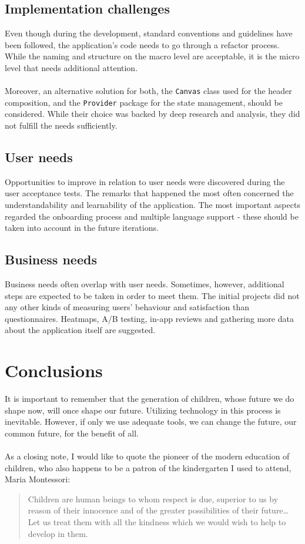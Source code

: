 \subsection{Implementation challenges}
Even though during the development, standard conventions and guidelines have been followed, the application's code needs to go through a refactor process. While the naming and structure on the macro level are acceptable, it is the micro level that needs additional attention.
\\\\
Moreover, an alternative solution for both, the \texttt{Canvas} class used for the header composition, and the \texttt{Provider} package for the state management, should be considered. While their choice was backed by deep research and analysis, they did not fulfill the needs sufficiently.


\subsection{User needs}
Opportunities to improve in relation to user needs were discovered during the user acceptance tests. The remarks that happened the most often concerned the understandability and learnability of the application. The most important aspects regarded the onboarding process and multiple language support - these should be taken into account in the future iterations.


\subsection{Business needs}
Business needs often overlap with user needs. Sometimes, however, additional steps are expected to be taken in order to meet them. The initial projects did not any other kinds of measuring users' behaviour and satisfaction than questionnaires. Heatmaps, A/B testing, in-app reviews and gathering more data about the application itself are suggested.

\section{Conclusions}\label{sec:summary:conclusions}
It is important to remember that the generation of children, whose future we do shape now, will once shape our future. Utilizing technology in this process is inevitable. However, if only we use adequate tools, we can change the future, our common future, for the benefit of all.
\\\\
As a closing note, I would like to quote the pioneer of the modern education of children, who also happens to be a patron of the kindergarten I used to attend, Maria Montessori:
\begin{quote}
Children are human beings to whom respect is due, superior to us by reason of their innocence and of the greater possibilities of their future… Let us treat them with all the kindness which we would wish to help to develop in them.
\end{quote}
